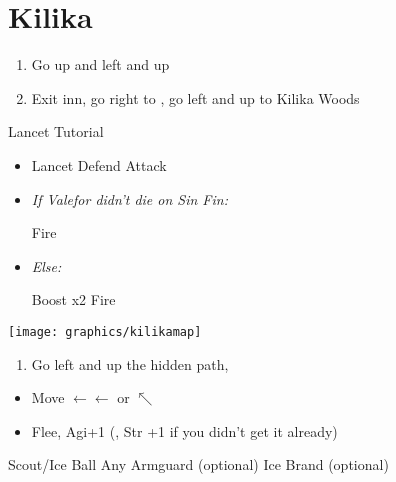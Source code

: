 \chapter{Kilika}

\begin{enumerate}
    \item Go up and left and up
    \item Exit inn, go right to \wakka, go left and up to Kilika Woods
\end{enumerate}
\begin{battle}{Lancet Tutorial}
    \begin{itemize}
        \item \sd
        \kimahrif Lancet
        \switch{\kimahri}{\wakka}
        \wakkaf Defend
        \tidusf Attack
        \item \textit{If Valefor didn't die on Sin Fin:}
        \begin{itemize}
            \luluf Fire
        \end{itemize}
        \item \textit{Else:}
        \begin{itemize}
            \switch{\lulu}{\yuna}
            \summon{\valefor}
            \valeforf Boost x2
            \valeforf Fire
        \end{itemize}
    \end{itemize}
\end{battle}
\texttt{[image: graphics/kilikamap]}
\begin{enumerate}[resume]
    \item Go left and up the hidden path, 
\end{enumerate}
\begin{spheregrid}
    \begin{itemize}
        \tidusf
        \begin{itemize}
            \item Move $\leftarrow\leftarrow$ or $\nwarrow$
            \item Flee, Agi+1 (, Str +1 if you didn't get it already)
        \end{itemize}
    \end{itemize}
\end{spheregrid}
\begin{equip}
    \begin{itemize}
        \wakkaf Scout/Ice Ball
        \wakkaf Any Armguard (optional)
        \tidusf Ice Brand (optional)
    \end{itemize}
\end{equip}
